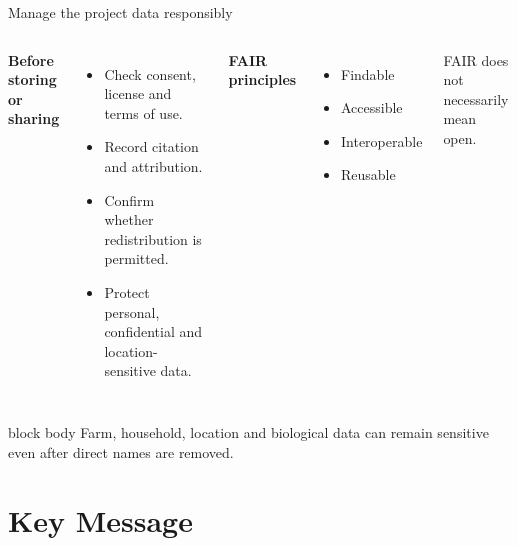 \documentclass[10pt,aspectratio=169]{beamer}
\begin{document}
\begin{frame}{Manage the project data responsibly}

\small

\begin{columns}[T]


\textbf{Before storing or sharing}

\begin{itemize}
  \item Check consent, license and terms of use.
  \item Record citation and attribution.
  \item Confirm whether redistribution is permitted.
  \item Protect personal, confidential and location-sensitive data.
\end{itemize}


\textbf{FAIR principles}

\begin{itemize}
  \item Findable
  \item Accessible
  \item Interoperable
  \item Reusable
\end{itemize}

\vspace{0.15cm}

FAIR does not necessarily mean open.

\end{columns}

\vspace{0.25cm}

\begin{beamercolorbox}[rounded=true,sep=8pt]{block body}
Farm, household, location and biological data can remain sensitive even after direct names are removed.
\end{beamercolorbox}

\end{frame}



\section{Key Message}
\end{document}
